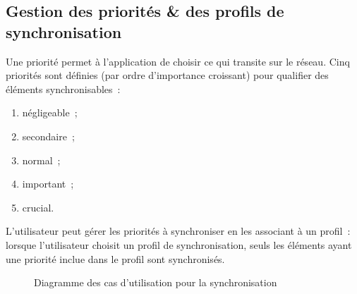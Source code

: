 \subsection{Gestion des priorités \& des profils de synchronisation}
Une priorité permet à l'application de \og choisir \fg{} ce qui transite sur le réseau.
Cinq priorités sont définies (par ordre d'importance croissant) pour qualifier des éléments synchronisables~:
\begin{enumerate}
    \item négligeable~;
    \item secondaire~;
    \item normal~;
    \item important~;
    \item crucial.
\end{enumerate}
L'utilisateur peut gérer les priorités à synchroniser en les associant à un profil~: lorsque l'utilisateur choisit un profil de synchronisation, seuls les éléments ayant une priorité inclue dans le profil sont synchronisés.
\begin{figure}[htbp]
    \centering
	\caption{Diagramme des cas d'utilisation pour la synchronisation}
	\label{ucsynchro}
\end{figure}

